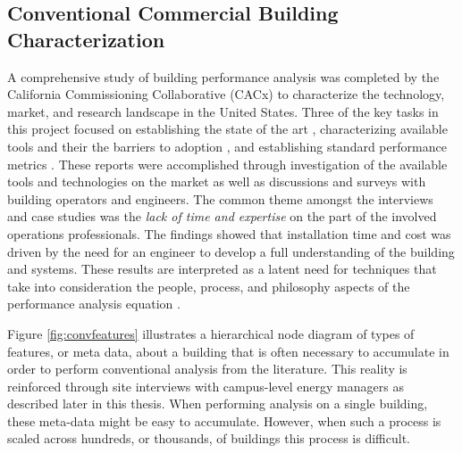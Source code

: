 \subsection{Conventional Commercial Building Characterization}
A comprehensive study of building performance analysis was completed by the California Commissioning Collaborative (CACx) to characterize the technology, market, and research landscape in the United States. Three of the key tasks in this project focused on establishing the state of the art \cite{effinger_building_2010}, characterizing available tools and their the barriers to adoption \cite{ulickey_building_2010}, and establishing standard performance metrics \cite{greensfelder_building_2010}. These reports were accomplished through investigation of the available tools and technologies on the market as well as discussions and surveys with building operators and engineers. The common theme amongst the interviews and case studies was the \emph{lack of time and expertise} on the part of the involved operations professionals. The findings showed that installation time and cost was driven by the need for an engineer to develop a full understanding of the building and systems. These results are interpreted as a latent need for techniques that take into consideration the people, process, and philosophy aspects of the performance analysis equation \cite{miller_applicability_2013}. 

Figure \ref{fig:convfeatures} illustrates a hierarchical node diagram of types of features, or meta data, about a building that is often necessary to accumulate in order to perform conventional analysis from the literature. This reality is reinforced through site interviews with campus-level energy managers as described later in this thesis. When performing analysis on a single building, these meta-data might be easy to accumulate. However, when such a process is scaled across hundreds, or thousands, of buildings this process is difficult.

